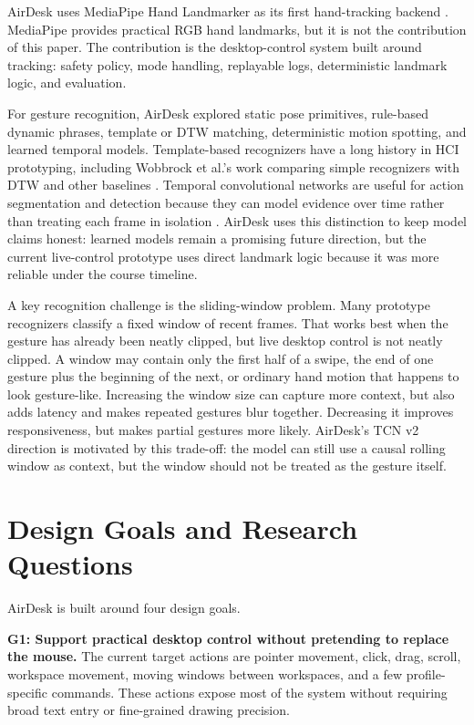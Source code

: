 \documentclass[manuscript]{acmart}
\begin{document}
AirDesk uses MediaPipe Hand Landmarker as its first hand-tracking backend \cite{zhang2020mediapipehands}. MediaPipe provides practical RGB hand landmarks, but it is not the contribution of this paper. The contribution is the desktop-control system built around tracking: safety policy, mode handling, replayable logs, deterministic landmark logic, and evaluation.

For gesture recognition, AirDesk explored static pose primitives, rule-based dynamic phrases, template or DTW matching, deterministic motion spotting, and learned temporal models. Template-based recognizers have a long history in HCI prototyping, including Wobbrock et al.'s work comparing simple recognizers with DTW and other baselines \cite{wobbrock2007dollar}. Temporal convolutional networks are useful for action segmentation and detection because they can model evidence over time rather than treating each frame in isolation \cite{lea2017tcn}. AirDesk uses this distinction to keep model claims honest: learned models remain a promising future direction, but the current live-control prototype uses direct landmark logic because it was more reliable under the course timeline.

A key recognition challenge is the sliding-window problem. Many prototype recognizers classify a fixed window of recent frames. That works best when the gesture has already been neatly clipped, but live desktop control is not neatly clipped. A window may contain only the first half of a swipe, the end of one gesture plus the beginning of the next, or ordinary hand motion that happens to look gesture-like. Increasing the window size can capture more context, but also adds latency and makes repeated gestures blur together. Decreasing it improves responsiveness, but makes partial gestures more likely. AirDesk's TCN v2 direction is motivated by this trade-off: the model can still use a causal rolling window as context, but the window should not be treated as the gesture itself.

\section{Design Goals and Research Questions}

AirDesk is built around four design goals.

\textbf{G1: Support practical desktop control without pretending to replace the mouse.} The current target actions are pointer movement, click, drag, scroll, workspace movement, moving windows between workspaces, and a few profile-specific commands. These actions expose most of the system without requiring broad text entry or fine-grained drawing precision.
\end{document}

